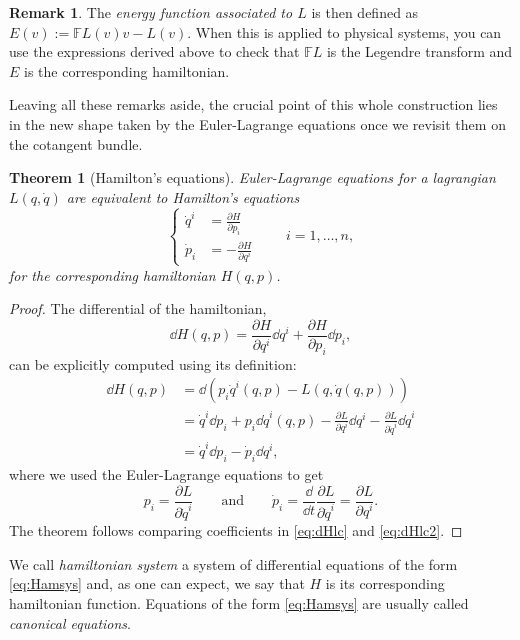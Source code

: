 \documentclass[english,fontsize=11pt,paper=b5]{scrbook}
\newtheorem{theorem}{Theorem}[chapter]
\theoremstyle{definition}
\newtheorem{remark}{Remark}[chapter]
\begin{document}
\begin{remark}
      The \emph{energy function associated to $L$} is then defined as $E(v) := \mathbb{F}L(v) v - L(v)$. When this is applied to physical systems, you can use the expressions derived above to check that $\mathbb{F}L$ is the Legendre transform and $E$ is the corresponding hamiltonian.
    \end{remark}

    Leaving all these remarks aside, the crucial point of this whole construction lies in the new shape taken by the Euler-Lagrange equations once we revisit them on the cotangent bundle.

    \begin{theorem}[Hamilton's equations]\label{thm:Hameqns}
      Euler-Lagrange equations for a lagrangian $L(q,\dot q)$ are equivalent to \emph{Hamilton's equations}
      \begin{equation}\label{eq:Hamsys}
        \left\lbrace
          \begin{aligned}
            \dot q^i & = \frac{\partial H}{\partial p_i}  \\
            \dot p_i & = -\frac{\partial H}{\partial q^i}
          \end{aligned}
        \right. \qquad i=1,\ldots,n,
      \end{equation}
      for the corresponding hamiltonian $H(q,p)$.
    \end{theorem}
    \begin{proof}
      The differential of the hamiltonian,
      \begin{equation}\label{eq:dHlc}
        \dd H(q,p) = \frac{\partial H}{\partial q^i}\dd q^i + \frac{\partial H}{\partial p_i}\dd p_i,
      \end{equation}
      can be explicitly computed using its definition:
      \begin{align}
        \dd H(q,p) & = \dd{}\left( p_i\dot{q}^i(q,p) - L(q, \dot{q}(q,p)) \right)                                                                             \\
                   & = \dot{q}^i \dd{p_i} + p_i \dd{\dot{q}^i}(q,p) - \frac{\partial L}{\partial q^i} \dd{q^i} - \frac{\partial L}{\partial \dot{q}^i} \dd{\dot{q}^i} \\
                   & = \dot{q}^i \dd{p_i} - \dot{p}_i \dd{q^i}, \label{eq:dHlc2}
      \end{align}
      where we used the Euler-Lagrange equations to get
      \begin{equation}
        p_i = \frac{\partial L}{\partial \dot{q}^i}
        \qquad\mbox{and}\qquad
        \dot p_i = \frac{\dd }{\dd t}\frac{\partial L}{\partial \dot{q}^i} = \frac{\partial L}{\partial q^i}.
      \end{equation}
      The theorem follows comparing coefficients in \eqref{eq:dHlc} and \eqref{eq:dHlc2}.
    \end{proof}
    We call \emph{hamiltonian system} a system of differential equations of the form \eqref{eq:Hamsys} and, as one can expect, we say that $H$ is its corresponding hamiltonian function. Equations of the form \eqref{eq:Hamsys} are usually called \emph{canonical equations}.
\end{document}
